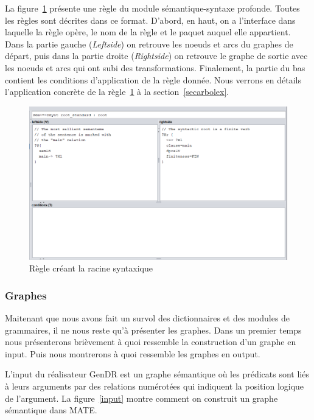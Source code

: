 La figure~\ref{fig:root} présente une règle du module sémantique-syntaxe profonde. Toutes les règles sont décrites dans ce format. D'abord, en haut, on a l'interface dans laquelle la règle opère, le nom de la règle et le paquet auquel elle appartient. Dans la partie gauche (\emph{Leftside}) on retrouve les noeuds et arcs du graphes de départ, puis dans la partie droite (\emph{Rightside}) on retrouve le graphe de sortie avec les noeuds et arcs qui ont subi des transformations. Finalement, la partie du bas contient les conditions d'application de la règle donnée. Nous verrons en détails l'application concrète de la règle~\ref{fig:root} à la section~\ref{secarbolex}.

\begin{figure}[htb]
	\centering
	\includegraphics[width=1\textwidth, trim = {0cm 0cm 0cm 0cm},clip]{ch3/figs/grammaire.png}
	\caption{Règle créant la racine syntaxique}
	\label{fig:root}
\end{figure}


\subsubsection{Graphes}\label{entree-sortie}

Maitenant que nous avons fait un survol des dictionnaires et des modules de grammaires, il ne nous reste qu'à présenter les graphes. Dans un premier temps nous présenterons brièvement à quoi ressemble la construction d'un graphe en input. Puis nous montrerons à quoi ressemble les graphes en output.

L'input du réalisateur GenDR est un graphe sémantique \citep{mel2012semantics} où les prédicats sont liés à leurs arguments par des relations numérotées qui indiquent la position logique de l'argument. La figure~\ref{input} montre comment on construit un graphe sémantique dans MATE.

